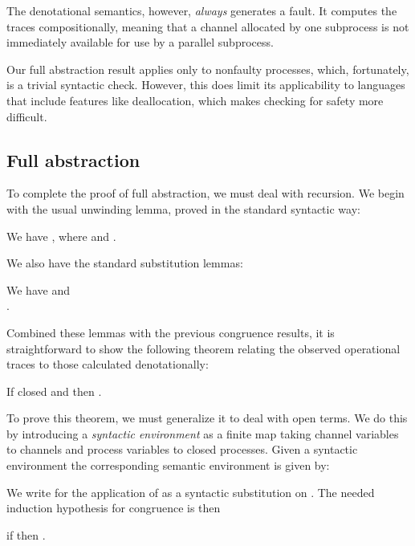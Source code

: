 \documentclass{entcs}
\begin{document}
The denotational semantics, however, \emph{always} generates a fault.
It computes the traces compositionally, meaning that a channel 
allocated by one subprocess is not immediately available for use by a
parallel subprocess.

Our full abstraction result applies only to nonfaulty processes,
which, fortunately, is a trivial syntactic check.  However, this does
limit its applicability to languages that include features like
deallocation, which makes checking for safety more difficult.








\subsection{Full abstraction}

To complete the proof of full abstraction, we must deal with
recursion.  We begin with the usual unwinding lemma, proved in the
standard syntactic way:

\begin{lemma}[Unwinding]
  We have
  , where  and .
\end{lemma}

We also have the standard substitution lemmas:
\begin{lemma}[Substitution]
  We have
   and\\
  .
\end{lemma}

\noindent
Combined these lemmas with the previous congruence results, it is
straightforward to show the following theorem relating the observed
operational traces to those calculated denotationally:

\begin{theorem}[Congruence]
  If  closed and  then
  .
\end{theorem}
\noindent
To prove this theorem, we must generalize it to deal with open terms.
We do this by introducing a \emph{syntactic environment}  as a
finite map taking channel variables to channels and process variables
to closed processes.  Given a syntactic environment  the
corresponding semantic environment  is given by:

We write  for the application of  as a syntactic
substitution on .  The needed induction hypothesis for congruence
is then 
\begin{center}
if  then .
\end{center}
\end{document}
